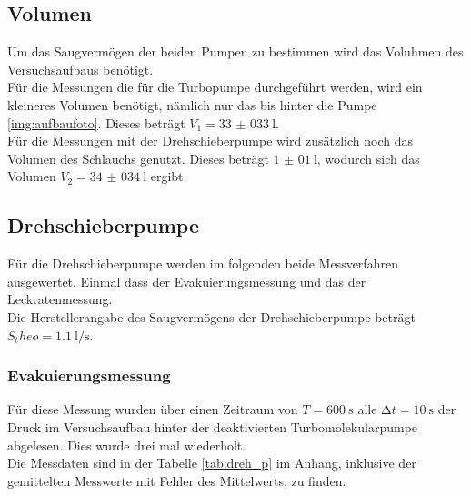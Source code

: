         \subsection{Volumen}
        Um das Saugvermögen der beiden Pumpen zu bestimmen wird das Voluhmen des Versuchsaufbaus benötigt.\\
        Für die Messungen die für die Turbopumpe durchgeführt werden, wird ein kleineres Volumen benötigt, nämlich nur das bis hinter die Pumpe \ref{img:aufbaufoto}.
        Dieses beträgt $V_1 = \SI{33(033)}{\litre}$.\\
        Für die Messungen mit der Drehschieberpumpe wird zusätzlich noch das Volumen des Schlauchs genutzt. Dieses beträgt $\SI{1(01)}{\litre}$, wodurch sich das Volumen $V_2 = \SI{34(034)}{\litre}$ ergibt.\\



        \subsection{Drehschieberpumpe}

        \noindent Für die Drehschieberpumpe werden im folgenden beide Messverfahren ausgewertet. Einmal dass der Evakuierungsmessung und das der Leckratenmessung.\\
        Die Herstellerangabe des Saugvermögens der Drehschieberpumpe beträgt $ S_theo = \SI{1.1}{\litre\per\second}$.

        \subsubsection{Evakuierungsmessung}

        \noindent Für diese Messung wurden über einen Zeitraum von $ T = \SI{600}{\second}$ alle $ \increment t = \SI{10}{\second}$
        der Druck im Versuchsaufbau hinter der deaktivierten Turbomolekularpumpe abgelesen. Dies wurde drei mal wiederholt.\\
        Die Messdaten sind in der Tabelle \ref{tab:dreh_p} im Anhang, inklusive der gemittelten Messwerte mit Fehler des Mittelwerts, zu finden.\\\\
        
